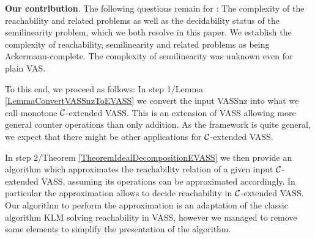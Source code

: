 
\textbf{Our contribution}. The following questions remain for \ConsideredModel: The complexity of the reachability and related problems as well as the decidability status of the semilinearity problem, which we both resolve in this paper. We establish the complexity of reachability, semilinearity and related problems as being Ackermann-complete. The complexity of semilinearity was unknown even for plain VAS. %

To this end, we proceed as follows: In step 1/Lemma \ref{LemmaConvertVASSnzToEVASS} we convert the input VASSnz into what we call monotone \(\mathcal{C}\)-extended VASS. This is an extension of VASS allowing more general counter operations than only addition. As the framework is quite general, we expect that there might be other applications for \(\mathcal{C}\)-extended VASS. 

In step 2/Theorem \ref{TheoremIdealDecompositionEVASS} we then provide an algorithm which approximates the reachability relation of a given input \(\mathcal{C}\)-extended VASS, assuming its operations can be approximated accordingly. In particular the approximation allows to decide reachability in \(\mathcal{C}\)-extended VASS. Our algorithm to perform the approximation is an adaptation of the classic algorithm KLM solving reachability in VASS, however we managed to remove some elements to simplify the presentation of the algorithm. 


